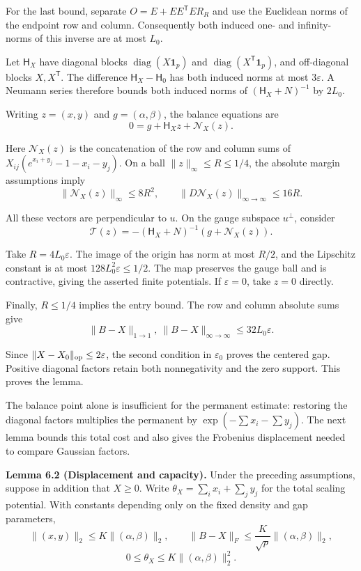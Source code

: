 \documentclass[11pt,a4paper]{article}
\makeatletter
\newcommand{\paperstatement}[3]{\par\addvspace{6pt}\Needspace{4\baselineskip}\phantomsection\def\@currentlabel{#2}\label{#3}\noindent\textbf{#1}\enspace}
\makeatother
\begin{document}
For the last bound, separate \(O=E+EE^{\mathsf T}ER_R\) and use the Euclidean norms of the endpoint row and column. Consequently both induced one- and infinity-norms of this inverse are at most \(L_0\).

Let \(\mathsf H_X\) have diagonal blocks \(\operatorname{diag}(X\mathbf 1_p)\) and \(\operatorname{diag}(X^{\mathsf T}\mathbf 1_p)\), and off-diagonal blocks \(X,X^{\mathsf T}\). The difference \(\mathsf H_X-\mathsf H_0\) has both induced norms at most \(3\varepsilon\). A Neumann series therefore bounds both induced norms of \((\mathsf H_X+N)^{-1}\) by \(2L_0\).

Writing \(z=(x,y)\) and \(g=(\alpha,\beta)\), the balance equations are
\[0=g+\mathsf H_Xz+\mathcal N_X(z).\]

Here \(\mathcal N_X(z)\) is the concatenation of the row and column sums of \(X_{ij}(e^{x_i+y_j}-1-x_i-y_j)\). On a ball \(\|z\|_\infty\le R\le1/4\), the absolute margin assumptions imply
\[\|\mathcal N_X(z)\|_\infty\le8R^2,\qquad \|D\mathcal N_X(z)\|_{\infty\to\infty}\le16R.\]

All these vectors are perpendicular to \(u\). On the gauge subspace \(u^\perp\), consider
\[\mathcal T(z)=-(\mathsf H_X+N)^{-1}(g+\mathcal N_X(z)).\]

Take \(R=4L_0\varepsilon\). The image of the origin has norm at most \(R/2\), and the Lipschitz constant is at most \(128L_0^2\varepsilon\le1/2\). The map preserves the gauge ball and is contractive, giving the asserted finite potentials. If \(\varepsilon=0\), take \(z=0\) directly.

Finally, \(R\le1/4\) implies the entry bound. The row and column absolute sums give
\[\|B-X\|_{1\to1},\ \|B-X\|_{\infty\to\infty}\le32L_0\varepsilon.\]

Since \(\|X-X_0\|_{\rm op}\le2\varepsilon\), the second condition in \(\varepsilon_0\) proves the centered gap. Positive diagonal factors retain both nonnegativity and the zero support. This proves the lemma.

The balance point alone is insufficient for the permanent estimate: restoring the diagonal factors multiplies the permanent by \(\exp(-\sum x_i-\sum y_j)\). The next lemma bounds this total cost and also gives the Frobenius displacement needed to compare Gaussian factors.

\paperstatement{Lemma 6.2 (Displacement and capacity).}{6.2}{thm-6.2} Under the preceding assumptions, suppose in addition that \(X\ge0\). Write \(\theta_X=\sum_i x_i+\sum_j y_j\) for the total scaling potential. With constants depending only on the fixed density and gap parameters,
\[\|(x,y)\|_2\le K\|(\alpha,\beta)\|_2,\qquad \|B-X\|_F\le\frac K{\sqrt p}\|(\alpha,\beta)\|_2,\]
\nopagebreak[3]\[0\le\theta_X\le K\|(\alpha,\beta)\|_2^2.\]
\end{document}
